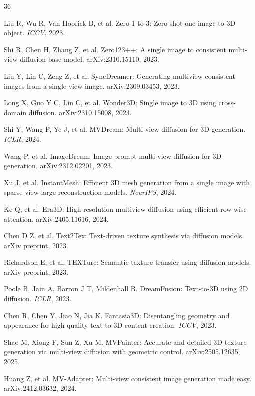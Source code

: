 \documentclass[times,twocolumn,final]{elsarticle}
\begin{document}
\begin{thebibliography}{36}

Liu R, Wu R, Van Hoorick B, et al. Zero-1-to-3: Zero-shot one image to 3D object. \textit{ICCV}, 2023.

Shi R, Chen H, Zhang Z, et al. Zero123++: A single image to consistent multi-view diffusion base model. arXiv:2310.15110, 2023.

Liu Y, Lin C, Zeng Z, et al. SyncDreamer: Generating multiview-consistent images from a single-view image. arXiv:2309.03453, 2023.

Long X, Guo Y C, Lin C, et al. Wonder3D: Single image to 3D using cross-domain diffusion. arXiv:2310.15008, 2023.

Shi Y, Wang P, Ye J, et al. MVDream: Multi-view diffusion for 3D generation. \textit{ICLR}, 2024.

Wang P, et al. ImageDream: Image-prompt multi-view diffusion for 3D generation. arXiv:2312.02201, 2023.

Xu J, et al. InstantMesh: Efficient 3D mesh generation from a single image with sparse-view large reconstruction models. \textit{NeurIPS}, 2024.

Ke Q, et al. Era3D: High-resolution multiview diffusion using efficient row-wise attention. arXiv:2405.11616, 2024.


Chen D Z, et al. Text2Tex: Text-driven texture synthesis via diffusion models. arXiv preprint, 2023.

Richardson E, et al. TEXTure: Semantic texture transfer using diffusion models. arXiv preprint, 2023.

Poole B, Jain A, Barron J T, Mildenhall B. DreamFusion: Text-to-3D using 2D diffusion. \textit{ICLR}, 2023.

Chen R, Chen Y, Jiao N, Jia K. Fantasia3D: Disentangling geometry and appearance for high-quality text-to-3D content creation. \textit{ICCV}, 2023.

Shao M, Xiong F, Sun Z, Xu M. MVPainter: Accurate and detailed 3D texture generation via multi-view diffusion with geometric control. arXiv:2505.12635, 2025.

Huang Z, et al. MV-Adapter: Multi-view consistent image generation made easy. arXiv:2412.03632, 2024.


\end{thebibliography}
\end{document}

